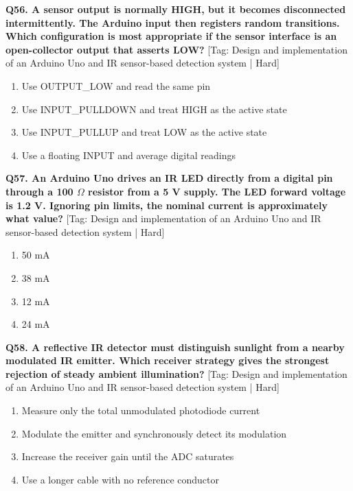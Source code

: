 \noindent\textbf{Q56. A sensor output is normally HIGH, but it becomes disconnected intermittently. The Arduino input then registers random transitions. Which configuration is most appropriate if the sensor interface is an open-collector output that asserts LOW?} \hfill [Tag: Design and implementation of an Arduino Uno and IR sensor-based detection system | Hard]
\begin{enumerate}[label=(\alph*),topsep=2pt,itemsep=1pt,partopsep=0pt,parsep=0pt]
    \item {Use OUTPUT\_LOW and read the same pin}
    \item {Use INPUT\_PULLDOWN and treat HIGH as the active state}
    \item {Use INPUT\_PULLUP and treat LOW as the active state}
    \item {Use a floating INPUT and average digital readings}
\end{enumerate}
\vspace{2mm}

\noindent\textbf{Q57. An Arduino Uno drives an IR LED directly from a digital pin through a 100 $\Omega$ resistor from a 5 V supply. The LED forward voltage is 1.2 V. Ignoring pin limits, the nominal current is approximately what value?} \hfill [Tag: Design and implementation of an Arduino Uno and IR sensor-based detection system | Hard]
\begin{enumerate}[label=(\alph*),topsep=2pt,itemsep=1pt,partopsep=0pt,parsep=0pt]
    \item {50 mA}
    \item {38 mA}
    \item {12 mA}
    \item {24 mA}
\end{enumerate}
\vspace{2mm}

\noindent\textbf{Q58. A reflective IR detector must distinguish sunlight from a nearby modulated IR emitter. Which receiver strategy gives the strongest rejection of steady ambient illumination?} \hfill [Tag: Design and implementation of an Arduino Uno and IR sensor-based detection system | Hard]
\begin{enumerate}[label=(\alph*),topsep=2pt,itemsep=1pt,partopsep=0pt,parsep=0pt]
    \item {Measure only the total unmodulated photodiode current}
    \item {Modulate the emitter and synchronously detect its modulation}
    \item {Increase the receiver gain until the ADC saturates}
    \item {Use a longer cable with no reference conductor}
\end{enumerate}
\vspace{2mm}

